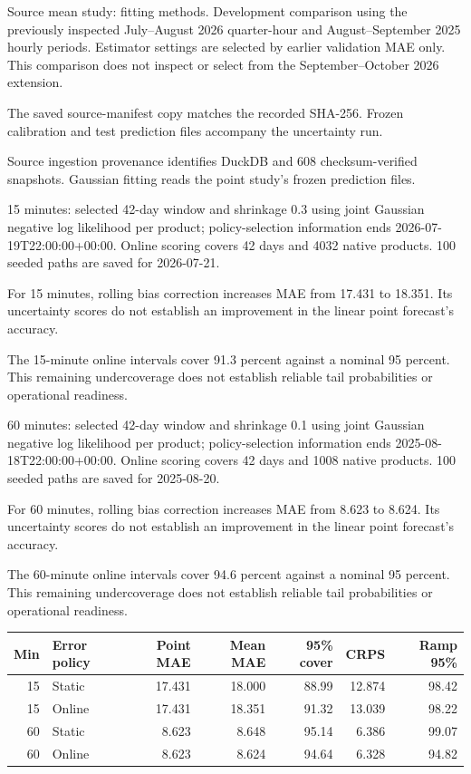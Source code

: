\documentclass[11pt,a4paper]{article}
\begin{document}
Source mean study: fitting methods. Development comparison using the previously inspected July–August 2026 quarter-hour and August–September 2025 hourly periods. Estimator settings are selected by earlier validation MAE only. This comparison does not inspect or select from the September–October 2026 extension.

The saved source-manifest copy matches the recorded SHA-256. Frozen calibration and test prediction files accompany the uncertainty run.

Source ingestion provenance identifies DuckDB  and 608 checksum-verified snapshots. Gaussian fitting reads the point study's frozen prediction files.

15 minutes: selected 42-day window and shrinkage 0.3 using joint Gaussian negative log likelihood per product; policy-selection information ends 2026-07-19T22:00:00+00:00. Online scoring covers 42 days and 4032 native products. 100 seeded paths are saved for 2026-07-21.

For 15 minutes, rolling bias correction increases MAE from 17.431 to 18.351. Its uncertainty scores do not establish an improvement in the linear point forecast's accuracy.

The 15-minute online intervals cover 91.3 percent against a nominal 95 percent. This remaining undercoverage does not establish reliable tail probabilities or operational readiness.

60 minutes: selected 42-day window and shrinkage 0.1 using joint Gaussian negative log likelihood per product; policy-selection information ends 2025-08-18T22:00:00+00:00. Online scoring covers 42 days and 1008 native products. 100 seeded paths are saved for 2025-08-20.

For 60 minutes, rolling bias correction increases MAE from 8.623 to 8.624. Its uncertainty scores do not establish an improvement in the linear point forecast's accuracy.

The 60-minute online intervals cover 94.6 percent against a nominal 95 percent. This remaining undercoverage does not establish reliable tail probabilities or operational readiness.

{\scriptsize\begin{longtable}{rlrrrrr}
\toprule Min & Error policy & Point MAE & Mean MAE & 95\% cover & CRPS & Ramp 95\% \\ \midrule
\endhead
15 & Static & 17.431 & 18.000 & 88.99 & 12.874 & 98.42 \\
15 & Online & 17.431 & 18.351 & 91.32 & 13.039 & 98.22 \\
60 & Static & 8.623 & 8.648 & 95.14 & 6.386 & 99.07 \\
60 & Online & 8.623 & 8.624 & 94.64 & 6.328 & 94.82 \\
\bottomrule\end{longtable}}
\end{document}

